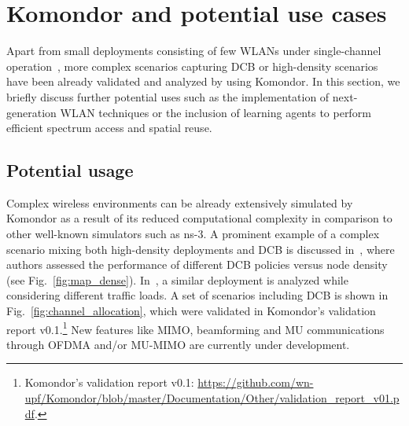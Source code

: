 \documentclass[conference]{IEEEtran}
\begin{document}
	
	
	
	\section{Komondor and potential use cases}
	\label{section:potential}
	
	Apart from small deployments consisting of few WLANs under single-channel operation~\cite{wilhelmi2018potential}, more complex scenarios capturing DCB or high-density scenarios have been already validated and analyzed by using Komondor. In this section, we briefly discuss further potential uses such as the implementation of next-generation WLAN techniques or the inclusion of learning agents to perform efficient spectrum access and spatial reuse.
	
	\subsection{Potential usage}
	
	Complex wireless environments can be already extensively simulated by Komondor as a result of its reduced computational complexity in comparison to other well-known simulators such as ns-3. 	
	A prominent example of a complex scenario mixing both high-density deployments and DCB is discussed in~\cite{barrachina2018performance}, where authors assessed the performance of different DCB policies versus node density (see Fig.~\ref{fig:map_dense}). In~\cite{barrachina2018overlap}, a similar deployment is analyzed while considering different traffic loads.
	A set of scenarios including DCB is shown in Fig.~\ref{fig:channel_allocation}, which were validated in Komondor's validation report v0.1.\footnote{Komondor's validation report v0.1: \url{https://github.com/wn-upf/Komondor/blob/master/Documentation/Other/validation_report_v01.pdf}.} New features like MIMO, beamforming and MU communications through OFDMA and/or MU-MIMO are currently under development.
	
\end{document}
